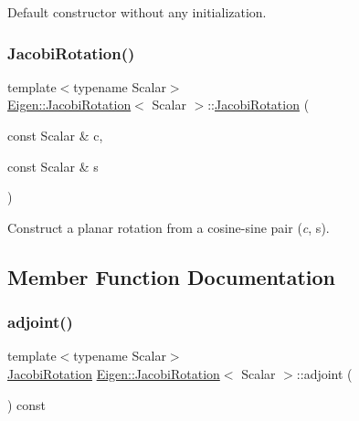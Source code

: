 Default constructor without any initialization. \mbox{\label{class_eigen_1_1_jacobi_rotation_a3e8b5dc0a56f7a2d0f788b1ccb1547cb}} 
\subsubsection{\texorpdfstring{JacobiRotation()}{JacobiRotation()}\hspace{0.1cm}{\footnotesize\ttfamily [2/2]}}
{\footnotesize\ttfamily template$<$typename Scalar$>$ \\
\mbox{\hyperlink{class_eigen_1_1_jacobi_rotation}{Eigen\+::\+Jacobi\+Rotation}}$<$ Scalar $>$\+::\mbox{\hyperlink{class_eigen_1_1_jacobi_rotation}{Jacobi\+Rotation}} (\begin{DoxyParamCaption}\item[{const Scalar \&}]{c,  }\item[{const Scalar \&}]{s }\end{DoxyParamCaption})\hspace{0.3cm}{\ttfamily [inline]}}

Construct a planar rotation from a cosine-\/sine pair ({\itshape c}, {\ttfamily s}). 

\subsection{Member Function Documentation}
\mbox{\label{class_eigen_1_1_jacobi_rotation_a89c8ea615f8fa77ddd5810a1e5fde4da}} 
\subsubsection{\texorpdfstring{adjoint()}{adjoint()}}
{\footnotesize\ttfamily template$<$typename Scalar$>$ \\
\mbox{\hyperlink{class_eigen_1_1_jacobi_rotation}{Jacobi\+Rotation}} \mbox{\hyperlink{class_eigen_1_1_jacobi_rotation}{Eigen\+::\+Jacobi\+Rotation}}$<$ Scalar $>$\+::adjoint (\begin{DoxyParamCaption}{ }\end{DoxyParamCaption}) const\hspace{0.3cm}{\ttfamily [inline]}}

